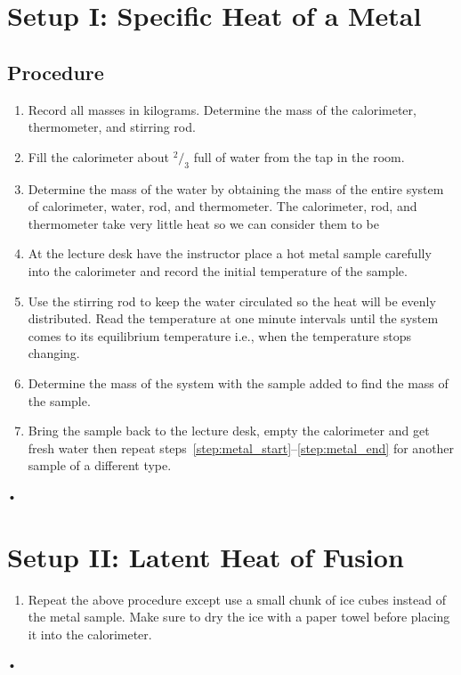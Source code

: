 \documentclass[main.tex]{subfiles}
\begin{document}
\section{Setup I: Specific Heat of a Metal}

\subsection*{Procedure}
\begin{enumerate}
\item \label{step:metal_start}
Record all masses in kilograms. Determine the mass of the calorimeter, thermometer, and stirring rod.
\item
Fill the calorimeter about $^2\!/_3$ full of water from the tap in the room.
\item
Determine the mass of the water by obtaining the mass of the entire system of calorimeter, water, rod, and thermometer. The calorimeter, rod, and thermometer take very little heat so we can consider them to be 
\item
At the lecture desk have the instructor place a hot metal sample carefully into the calorimeter and record the initial temperature of the sample.
\item
Use the stirring rod to keep the water circulated so the heat will be evenly distributed. Read the temperature at one minute intervals until the system comes to its equilibrium temperature i.e., when the temperature stops changing.
\item \label{step:metal_end}
Determine the mass of the system with the sample added to find the mass of the sample.
\item
Bring the sample back to the lecture desk, empty the calorimeter and get fresh water then repeat steps~\ref{step:metal_start}--\ref{step:metal_end} for another sample of a different type.
\end{enumerate}•

\section{Setup II: Latent Heat of Fusion}
\begin{enumerate}
\item
Repeat the above procedure except use a small chunk of ice cubes instead of the metal sample. Make sure to dry the ice with a paper towel before placing it into the calorimeter.
\end{enumerate}•
\end{document}
